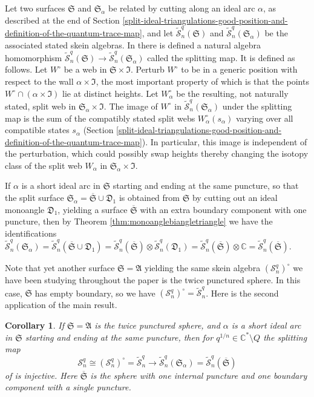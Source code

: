 \documentclass[12pt,
	]{amsart}
\newtheorem{corollary}[theorem]{Corollary}
\theoremstyle{definition}
\renewcommand{\bar}{\overline}
\renewcommand{\tilde}{\widetilde}
\newcommand{\mbb}[1]{\mathbb{#1}}
\newcommand{\mcal}[1]{\mathcal{#1}}
\newcommand{\mfrak}[1]{\mathfrak{#1}}
\newcommand{\lp}{\left(}\newcommand{\rp}{\right)}
\newcommand{\unbased}[1]{#1^\circ}
\newcommand{\C}{\mbb{C}}
\newcommand{\sC}{\C^\ast}
\newcommand{\sk}{\mcal{S}_n^q}
\newcommand{\usk}{\unbased{\lp\sk\rp}}
\newcommand{\ann}{\mfrak{A}}
\newcommand{\surf}{\mfrak{S}}
\newcommand{\intt}{\mfrak{I}}
\newcommand{\badset}{Q}
\newcommand{\qroot}{q^{1/n}}
\newcommand{\ssk}{\tilde{\mcal{S}}_n^q}
\newcommand{\monoangle}{\mfrak{D}_1}
\begin{document}
Let two surfaces $\surf$ and $\surf_\alpha$ be related by cutting along an ideal arc $\alpha$, as described at the end of Section \ref{split-ideal-triangulations-good-position-and-definition-of-the-quantum-trace-map}, and let $\ssk(\surf)$ and $\ssk(\surf_\alpha)$ be the associated stated skein algebras.  In \cite{leMR3827810, LeArxiv21} there is defined a natural algebra homomorphism $\ssk(\surf)\to\ssk(\surf_\alpha)$ called the splitting map.  It is defined as follows.  Let $\unbased{W}$ be a web in $\surf\times\intt$.  Perturb $\unbased{W}$ to be in a generic position with respect to the wall $\alpha\times\intt$, the most important property of which is that the points $\unbased{W}\cap(\alpha\times\intt)$ lie at distinct heights.  Let $\unbased{W}_\alpha$ be the resulting, not naturally stated, split web in $\surf_\alpha\times\intt$.  The image of $\unbased{W}$ in $\ssk(\surf_\alpha)$ under the splitting map is the sum of the compatibly stated split webs $\unbased{W}_\alpha(s_\alpha)$ varying over all compatible states $s_\alpha$ (Section \ref{split-ideal-triangulations-good-position-and-definition-of-the-quantum-trace-map}).  In particular, this image is independent of the perturbation, which could possibly swap heights thereby changing the isotopy class of the split web $W_\alpha$ in $\surf_\alpha\times\intt$.  

If $\alpha$ is a short ideal arc in $\surf$ starting and ending at the same puncture, so that the split surface $\surf_\alpha=\bar{\surf}\cup\monoangle$ is obtained from $\surf$ by cutting out an ideal monoangle $\monoangle$, yielding a surface $\bar{\surf}$ with an extra boundary component with one puncture, then by Theorem \ref{thm:monoanglebiangletriangle} we have the identifications $\ssk(\surf_\alpha)=\ssk(\bar{\surf}\cup\monoangle)=\ssk(\bar{\surf})\otimes\ssk(\monoangle)=\ssk(\bar{\surf})\otimes\C=\ssk(\bar{\surf})$.  

Note that yet another surface $\surf=\ann$ yielding the same skein algebra $\usk$ we have been studying throughout the paper is the twice punctured sphere.  In this case, $\surf$ has empty boundary, so we have $\usk=\ssk$.  Here is the second application of the main result.  

\begin{corollary}\label{cor:secondapplication}
If $\surf=\ann$ is the twice punctured sphere, and $\alpha$ is a short ideal arc in $\surf$ starting and ending at the same puncture, then for $\qroot\in\sC\setminus\badset$ the splitting map 
\begin{equation*}
\sk\cong\usk=\ssk\to\ssk(\surf_\alpha)=\ssk(\bar{\surf})
\end{equation*} 
of \cite{LeArxiv21} is injective.  Here $\bar{\surf}$ is the sphere with one internal puncture and one boundary component with a single puncture.  
\end{corollary}
\end{document}
